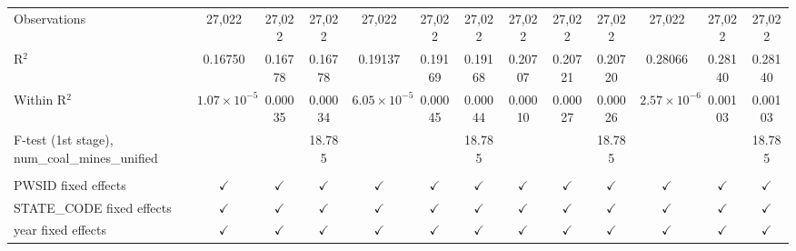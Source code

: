 \begin{table}[htbp]
\begin{adjustbox}{width = \textwidth, center}
\begin{tabular}{lcccccccccccc}
          \\
         Observations                                     & 27,022                & 27,022         & 27,022        & 27,022                & 27,022         & 27,022        & 27,022        & 27,022        & 27,022        & 27,022                & 27,022        & 27,022\\  
         R$^2$                                            & 0.16750               & 0.16778        & 0.16778       & 0.19137               & 0.19169        & 0.19168       & 0.20707       & 0.20721       & 0.20720       & 0.28066               & 0.28140       & 0.28140\\  
         Within R$^2$                                     & $1.07\times 10^{-5}$  & 0.00035        & 0.00034       & $6.05\times 10^{-5}$  & 0.00045        & 0.00044       & 0.00010       & 0.00027       & 0.00026       & $2.57\times 10^{-6}$  & 0.00103       & 0.00103\\  
         F-test (1st stage), num\_coal\_mines\_unified    &                       &                & 18.785        &                       &                & 18.785        &               &               & 18.785        &                       &               & 18.785\\  
          \\
         PWSID fixed effects                              & $\checkmark$          & $\checkmark$   & $\checkmark$  & $\checkmark$          & $\checkmark$   & $\checkmark$  & $\checkmark$  & $\checkmark$  & $\checkmark$  & $\checkmark$          & $\checkmark$  & $\checkmark$\\   
         STATE\_CODE fixed effects                        & $\checkmark$          & $\checkmark$   & $\checkmark$  & $\checkmark$          & $\checkmark$   & $\checkmark$  & $\checkmark$  & $\checkmark$  & $\checkmark$  & $\checkmark$          & $\checkmark$  & $\checkmark$\\   
         year fixed effects                               & $\checkmark$          & $\checkmark$   & $\checkmark$  & $\checkmark$          & $\checkmark$   & $\checkmark$  & $\checkmark$  & $\checkmark$  & $\checkmark$  & $\checkmark$          & $\checkmark$  & $\checkmark$\\   
         \bottomrule
      \end{tabular}
   \end{adjustbox}
\end{table}



